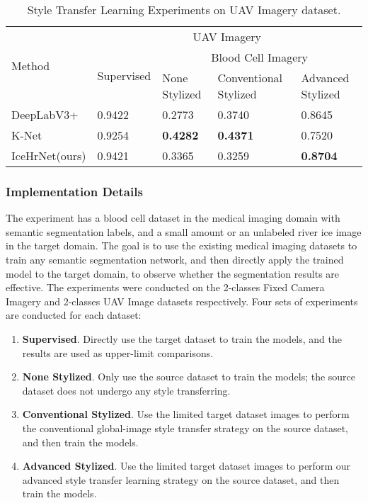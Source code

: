 \documentclass[a4paper,fleqn]{cas-dc}
\begin{document}
\begin{table*}[htbp]
	\centering
	\caption{Style Transfer Learning Experiments on UAV Imagery dataset.}\label{tbl7}
	\begin{tabular*}{\tblwidth}{*{2}{p{24mm}<{\centering}}*{3}{p{34.7mm}<{\centering}}}
		\toprule
		\multirow{3}{*}{Method} & \multicolumn{4}{c}{UAV Imagery} \\
		\cline{2-5}
		& \multirow{2}{*}{Supervised} & \multicolumn{3}{c}{Blood Cell Imagery} \\
		\cline{3-5}
		&  & None Stylized & Conventional Stylized & Advanced Stylized \\
		\midrule
		DeepLabV3+ & 0.9422 & 0.2773 & 0.3740 & 0.8645 \\
		K-Net & 0.9254 & \textbf{0.4282} & \textbf{0.4371} & 0.7520 \\
		IceHrNet(ours) & 0.9421 & 0.3365 & 0.3259 & \textbf{0.8704} \\
		\bottomrule
	\end{tabular*}
\end{table*}

\subsubsection{Implementation Details}

The experiment has a blood cell dataset in the medical imaging domain with semantic segmentation labels, and a small amount or an unlabeled river ice image in the target domain. The goal is to use the existing medical imaging datasets to train any semantic segmentation network, and then directly apply the trained model to the target domain, to observe whether the segmentation results are effective. The experiments were conducted on the 2-classes Fixed Camera Imagery and 2-classes UAV Image datasets respectively. Four sets of experiments are conducted for each dataset:
\begin{enumerate}
	\item \textbf{Supervised}. Directly use the target dataset to train the models, and the results are used as upper-limit comparisons.
	\item \textbf{None Stylized}. Only use the source dataset to train the models; the source dataset does not undergo any style transferring.
	\item \textbf{Conventional Stylized}. Use the limited target dataset images to perform the conventional global-image style transfer strategy \cite{Jackson_Atapour_Abarghouei_Bonner_Breckon_Obara_2019, Li_Ye_Cao_Hou_Yang_2021, Zhao_Wei_Lu_Bai_Zhao_Chen_Hu_2023} on the source dataset, and then train the models.
	\item \textbf{Advanced Stylized}. Use the limited target dataset images to perform our advanced style transfer learning strategy on the source dataset, and then train the models.
\end{enumerate}  
\end{document}
